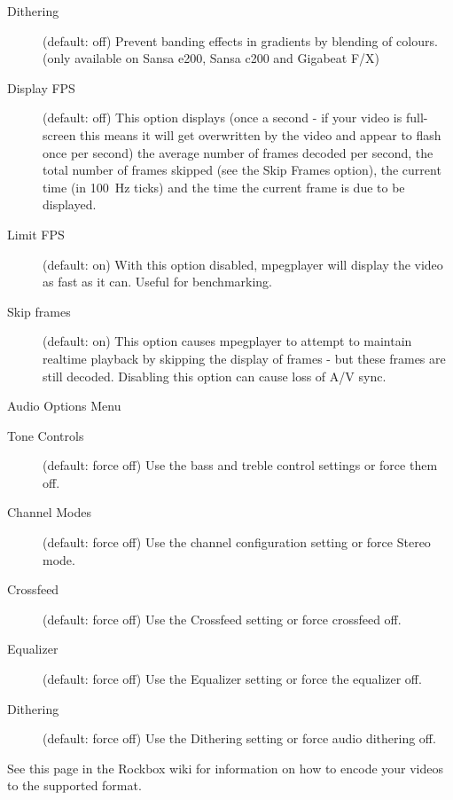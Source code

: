 \begin{description}
\item[Dithering] (default: off) Prevent banding effects in gradients by blending
    of colours. (only available on Sansa e200, Sansa c200 and Gigabeat F/X)
\item[Display FPS] (default: off) This option displays (once a second - if your
    video is full-screen this means it will get overwritten by the video and
    appear to flash once per second) the average number of frames decoded per
    second, the total number of frames skipped (see the Skip Frames option),
    the current time (in 100~Hz ticks) and the time the current frame is due to
    be displayed.
\item[Limit FPS] (default: on) With this option disabled, mpegplayer will
    display the video as fast as it can. Useful for benchmarking.
\item[Skip frames] (default: on) This option causes mpegplayer to attempt to
    maintain realtime playback by skipping the display of frames - but these
    frames are still decoded. Disabling this option can cause loss of A/V sync.
\end{description}

Audio Options Menu

\begin{description}
\item[Tone Controls] (default: force off) Use the bass and treble control
    settings or force them off.
\item[Channel Modes] (default: force off) Use the channel configuration setting
    or force Stereo mode.
\item[Crossfeed] (default: force off) Use the Crossfeed setting or force
    crossfeed off.
\item[Equalizer] (default: force off) Use the Equalizer setting or force the
    equalizer off.
\item[Dithering] (default: force off) Use the Dithering setting or force
    audio dithering off.
\end{description}

See this page in the Rockbox wiki for information on how to encode your videos
to the supported format. 
